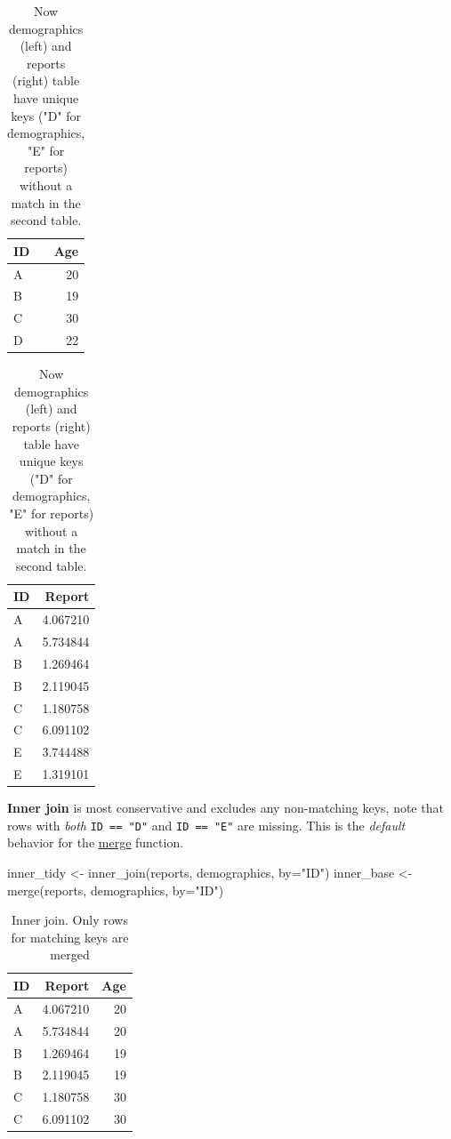 \documentclass[
]{book}
\newenvironment{Shaded}{\begin{snugshade}}{\end{snugshade}}
\newcommand{\AttributeTok}[1]{\textcolor[rgb]{0.77,0.63,0.00}{#1}}
\newcommand{\FunctionTok}[1]{\textcolor[rgb]{0.00,0.00,0.00}{#1}}
\newcommand{\NormalTok}[1]{#1}
\newcommand{\OtherTok}[1]{\textcolor[rgb]{0.56,0.35,0.01}{#1}}
\newcommand{\StringTok}[1]{\textcolor[rgb]{0.31,0.60,0.02}{#1}}
\begin{document}
\begin{table}
\caption{\label{tab:unnamed-chunk-179}Now demographics (left) and reports (right) table have unique keys ("D" for demographics, "E" for reports) without a match in the second table.}

\centering
\begin{tabular}[t]{l|r}
\hline
ID & Age\\
\hline
A & 20\\
\hline
B & 19\\
\hline
C & 30\\
\hline
D & 22\\
\hline
\end{tabular}
\centering
\begin{tabular}[t]{l|r}
\hline
ID & Report\\
\hline
A & 4.067210\\
\hline
A & 5.734844\\
\hline
B & 1.269464\\
\hline
B & 2.119045\\
\hline
C & 1.180758\\
\hline
C & 6.091102\\
\hline
E & 3.744488\\
\hline
E & 1.319101\\
\hline
\end{tabular}
\end{table}

\textbf{Inner join} is most conservative and excludes any non-matching keys, note that rows with \emph{both} \texttt{ID\ ==\ "D"} and \texttt{ID\ ==\ "E"} are missing. This is the \emph{default} behavior for the \href{https://stat.ethz.ch/R-manual/R-devel/library/base/html/merge.html}{merge} function.

\begin{Shaded}
\begin{Highlighting}[]
\NormalTok{inner\_tidy }\OtherTok{\textless{}{-}} \FunctionTok{inner\_join}\NormalTok{(reports, demographics, }\AttributeTok{by=}\StringTok{"ID"}\NormalTok{) }
\NormalTok{inner\_base }\OtherTok{\textless{}{-}} \FunctionTok{merge}\NormalTok{(reports, demographics, }\AttributeTok{by=}\StringTok{"ID"}\NormalTok{)}
\end{Highlighting}
\end{Shaded}

\begin{table}

\caption{\label{tab:unnamed-chunk-181}Inner join. Only rows for matching keys are merged}
\centering
\begin{tabular}[t]{l|r|r}
\hline
ID & Report & Age\\
\hline
A & 4.067210 & 20\\
\hline
A & 5.734844 & 20\\
\hline
B & 1.269464 & 19\\
\hline
B & 2.119045 & 19\\
\hline
C & 1.180758 & 30\\
\hline
C & 6.091102 & 30\\
\hline
\end{tabular}
\end{table}
\end{document}
